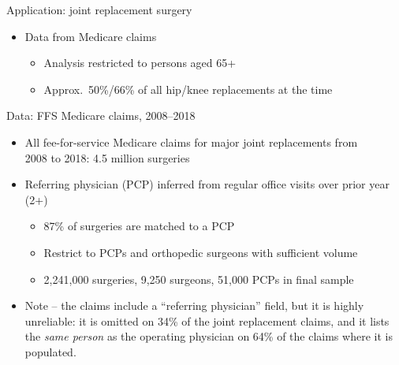 \documentclass[slides, aspectratio=169]{beamer}
\newcommand{\bit}{\begin{itemize}}
\newcommand{\eit}{\end{itemize}}
\begin{document}
\begin{frame}{Application: joint replacement surgery}
\begin{itemize}
\item Data from Medicare claims %
\bit
    \item Analysis restricted to persons aged 65+
    \item Approx.~50\%/66\% of all hip/knee replacements at the time
\eit

\end{itemize}
\end{frame}


\begin{frame}{Data: FFS Medicare claims, 2008--2018} \label{data}
\begin{itemize}

\item All fee-for-service Medicare claims for major joint replacements from \\ 2008 to 2018: 4.5 million surgeries
\bigskip

\item Referring physician (PCP) inferred from regular office visits over prior year (2+)
\bit
    \item 87\% of surgeries are matched to a PCP
    \item Restrict to PCPs and orthopedic surgeons with sufficient volume 
    \item 2,241,000 surgeries, 9,250 surgeons, 51,000 PCPs in final sample
\eit
\bigskip %

\color{gray} 

\item Note -- the claims include a ``referring physician'' field, but it is highly unreliable: it is omitted on 34\% of the joint replacement claims, and it lists the \emph{same person} as the operating physician on 64\% of the claims where it is populated.
\bigskip

\end{itemize}
\end{frame}

\end{document}
